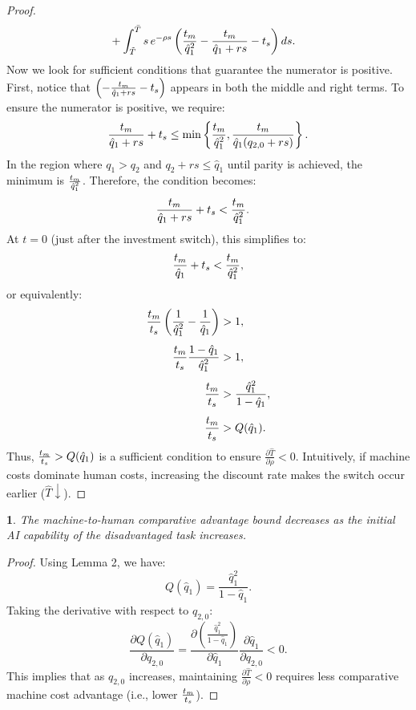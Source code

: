 \documentclass{article}
\theoremstyle{plain}
\theoremstyle{plain}
\newtheorem{cor}{\protect\corollaryname}
\newtheorem{cor}{\protect\corollaryname}[chapter]
\providecommand{\corollaryname}{Corollary}
\begin{document}
\begin{proof}
\begin{align*}
& + \int_{\tilde{T}}^{\bar{T}} s\,e^{-\rho s} \left(\frac{t_{m}}{\hat{q}_{1}^{2}} - \frac{t_{m}}{\hat{q}_{1} + rs} - t_{s}\right) ds.
\end{align*}
Now we look for sufficient conditions that guarantee the numerator is positive.  
First, notice that $\left(-\frac{t_{m}}{\hat{q}_{1}+rs}-t_{s}\right)$ appears in both the middle and right terms.  
To ensure the numerator is positive, we require:
\[
\frac{t_{m}}{\hat{q}_{1}+rs}+t_{s}\leq \min\left\{\frac{t_{m}}{\hat{q}_{1}^{2}},\frac{t_{m}}{\hat{q}_{1}(q_{2,0}+rs)}\right\}.
\]
In the region where $q_{1}>q_{2}$ and $q_{2}+rs\leq\hat{q}_{1}$ until parity is achieved, the minimum is $\frac{t_{m}}{\hat{q}_{1}^{2}}$.  
Therefore, the condition becomes: 
\begin{align*}
\frac{t_{m}}{\hat{q}_{1}+rs}+t_{s} & <\frac{t_{m}}{\hat{q}_{1}^{2}}.
\end{align*}
At $t=0$ (just after the investment switch), this simplifies to:
\[
\frac{t_{m}}{\hat{q}_{1}}+t_{s}<\frac{t_{m}}{\hat{q}_{1}^{2}},
\]
or equivalently:
\begin{align*}
\frac{t_{m}}{t_{s}}\left(\frac{1}{\hat{q}_{1}^{2}}-\frac{1}{\hat{q}_{1}}\right) & >1,\\[1ex]
\frac{t_{m}}{t_{s}}\frac{1-\hat{q}_{1}}{\hat{q}_{1}^{2}} & >1,\\[1ex]
\frac{t_{m}}{t_{s}} & >\frac{\hat{q}_{1}^{2}}{1-\hat{q}_{1}},\\[1ex]
\frac{t_{m}}{t_{s}} & >Q(\hat{q}_{1}).
\end{align*}
Thus, $\frac{t_{m}}{t_{s}}>Q(\hat{q}_{1})$ is a sufficient condition to ensure $\frac{\partial\hat{T}}{\partial\rho}<0$.  
Intuitively, if machine costs dominate human costs, increasing the discount rate makes the switch occur earlier ($\hat{T}\downarrow$).
\end{proof}

\begin{cor}
The machine-to-human comparative advantage bound decreases as the initial AI capability of the disadvantaged task increases.
\end{cor}

\begin{proof}
Using Lemma 2, we have:
\[
Q(\hat{q}_{1})=\frac{\hat{q}_{1}^{2}}{1-\hat{q}_{1}}.
\]
Taking the derivative with respect to $q_{2,0}$:
\[
\frac{\partial Q(\hat{q}_{1})}{\partial q_{2,0}}=\frac{\partial\left(\frac{\hat{q}_{1}^{2}}{1-\hat{q}_{1}}\right)}{\partial\hat{q}_{1}}\frac{\partial\hat{q}_{1}}{\partial q_{2,0}}<0.
\]
This implies that as $q_{2,0}$ increases, maintaining $\frac{\partial\hat{T}}{\partial\rho}<0$ requires less comparative machine cost advantage (i.e., lower $\frac{t_{m}}{t_{s}}$).
\end{proof}
\end{document}

